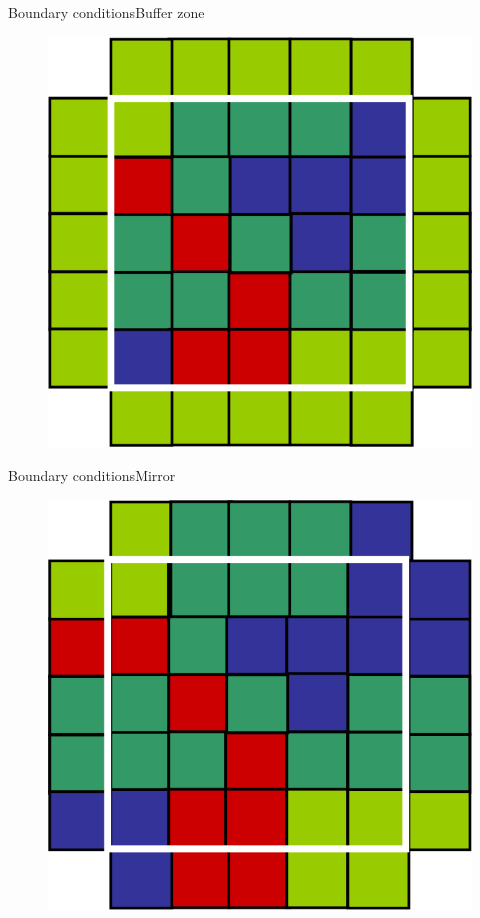 \documentclass{eecslides}
\begin{document}
	\begin{frame}{Boundary conditions}{Buffer zone}

		\begin{figure}[!t]
			\includegraphics[height=0.55\textheight]{buffer}
		\end{figure}

	\end{frame}


	\begin{frame}{Boundary conditions}{Mirror}

		\begin{figure}[!t]
			\includegraphics[height=0.55\textheight]{mirror}
		\end{figure}

	\end{frame}
\end{document}
